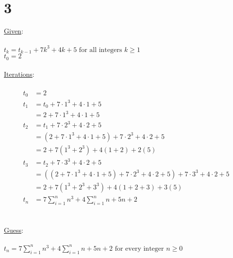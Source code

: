 \documentclass[12pt]{article}
\begin{document}
\newpage
\section*{3}
\underline{Given}:
\\ \\
$t_k = t_{k-1} + 7k^3 + 4k + 5 \text{ for all integers } k \geq 1$ \\
$t_0 = 2$
\\ \\
\underline{Iterations}:
\\ \\
\begin{align*}
  t_0 &= 2 \\
  t_1 &= t_0 + 7\cdot 1^3 + 4\cdot1 + 5 \\
  &= 2 + 7\cdot 1^3 + 4\cdot1 + 5 \\
  t_2 &= t_1 + 7\cdot 2^3 + 4\cdot2 + 5 \\
  &= (2 + 7\cdot 1^3 + 4\cdot1 + 5) + 7\cdot 2^3 + 4\cdot2 + 5 \\
  &= 2 + 7(1^3 + 2^3) + 4(1+2) + 2(5) \\
  t_3 &= t_2 + 7\cdot 3^3 + 4\cdot2 + 5 \\
  &= ((2 + 7\cdot 1^3 + 4\cdot1 + 5) + 7\cdot 2^3 + 4\cdot2 + 5) + 7\cdot 3^3 + 4\cdot2 + 5 \\
  &= 2 + 7(1^3 + 2^3 + 3^3) + 4(1+2+3) + 3(5) \\
  t_n &= 7\sum_{i=1}^{n}n^3 + 4\sum_{i=1}^{n}n + 5n + 2
\end{align*}
\\ \\
\underline{Guess}:
\\ \\
$t_n = 7\sum_{i=1}^{n}n^3 + 4\sum_{i=1}^{n}n + 5n + 2 \text{ for every integer }n \geq 0$ \\
\newpage
\end{document}
